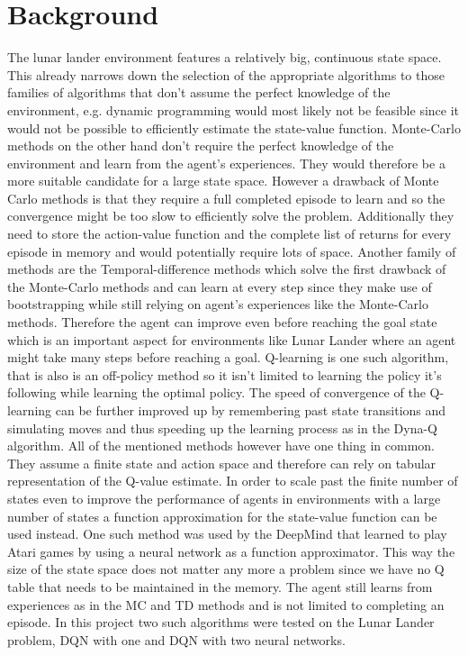 \documentclass{article}
\begin{document}
\section{Background}
The lunar lander environment features a relatively big, continuous state space. This already narrows down the selection of the appropriate algorithms to those families of algorithms that don't assume the perfect knowledge of the environment, e.g. dynamic programming would most likely not be feasible since it would not be possible to efficiently estimate the state-value function. Monte-Carlo methods on the other hand don't require the perfect knowledge of the environment and learn from the agent's experiences. They would therefore be a more suitable candidate for a large state space. However a drawback of Monte Carlo methods is that they require a full completed episode to learn and so the convergence might be too slow to efficiently solve the problem. Additionally they need to store the action-value function and the complete list of returns for every episode in memory and would potentially require lots of space. Another family of methods are the Temporal-difference methods which solve the first drawback of the Monte-Carlo methods and can learn at every step since they make use of bootstrapping while still relying on agent's experiences like the Monte-Carlo methods. Therefore the agent can improve even before reaching the goal state which is an important aspect for environments like Lunar Lander where an agent might take many steps before reaching a goal. Q-learning is one such algorithm, that is also is an off-policy method so it isn't limited to learning the policy it's following while learning the optimal policy. The speed of convergence of the Q-learning can be further improved up by remembering past state transitions and simulating moves and thus speeding up the learning process as in the Dyna-Q algorithm. All of the mentioned methods however have one thing in common. They assume a finite state and action space and therefore can rely on tabular representation of the Q-value estimate. In order to scale past the finite number of states even to improve the performance of agents in environments with a large number of states a function approximation for the state-value function can be used instead. One such method was used by the DeepMind that learned to play Atari games by using a neural network as a function approximator. This way the size of the state space does not matter any more a problem since we have no Q table that needs to be maintained in the memory. The agent still learns from experiences as in the MC and TD methods and is not limited to completing an episode. In this project two such algorithms were tested on the Lunar Lander problem, DQN with one and DQN with two neural networks.
 
\end{document}

